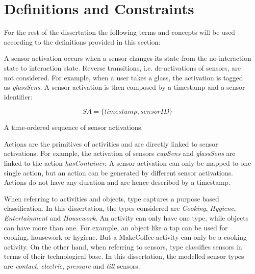 \section{Definitions and Constraints}
\label{sec:approach:def}

For the rest of the dissertation the following terms and concepts will be used according to the definitions provided in this section:

\begin{defn}
\label{def-sa}
 A sensor activation occurs when a sensor changes its state from the no-interaction state to interaction state. Reverse transitions, i.e. de-activations of sensors, are not considered. For example, when a user takes a glass, the activation is tagged as \textit{glassSens}. A sensor activation is then composed by a timestamp and a sensor identifier:
 
 \begin{equation}
  SA = \{ timestamp, sensorID \}
 \end{equation}

\end{defn}

\begin{defn}
\label{def-sa-dataset}
 A time-ordered sequence of sensor activations.
\end{defn}

\begin{defn}[Actions]
\label{def-action}
 Actions are the primitives of activities and are directly linked to sensor activations. For example, the activation of sensors \textit{cupSens} and \textit{glassSens} are linked to the action \textit{hasContainer}. A sensor activation can only be mapped to one single action, but an action can be generated by different sensor activations. Actions do not have any duration and are hence described by a timestamp.
\end{defn}

\begin{defn}[Type]
\label{def-type}
 When referring to activities and objects, type captures a purpose based classification. In this dissertation, the types considered are \textit{Cooking}, \textit{Hygiene}, \textit{Entertainment} and \textit{Housework}. An activity can only have one type, while objects can have more than one. For example, an object like a tap can be used for cooking, housework or hygiene. But a MakeCoffee activity can only be a cooking activity. On the other hand, when referring to sensors, type classifies sensors in terms of their technological base. In this dissertation, the modelled sensor types are \textit{contact}, \textit{electric}, \textit{pressure} and \textit{tilt} sensors. 
\end{defn}

